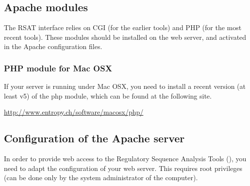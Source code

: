 \documentclass[12pt,a4paper, twoside]{scrreprt} %
\begin{document}
\subsection{Apache modules}

The RSAT interface relies on CGI (for the earlier tools) and PHP (for
the most recent tools). These modules should be installed on the web
server, and activated in the Apache configuration files. 

\subsubsection{PHP module for Mac OSX}

If your server is running under Mac OSX, you need to install a recent
version (at least v5) of the php module, which can be found at the following site. 

\url{http://www.entropy.ch/software/macosx/php/}

\subsection{Configuration of the Apache server}

In order to provide web access to the Regulatory Sequence Analysis
Tools (\RSAT), you need to adapt the configuration of your web
server. This requires root privileges (can be done only by the system
administrator of the computer).
\end{document}
